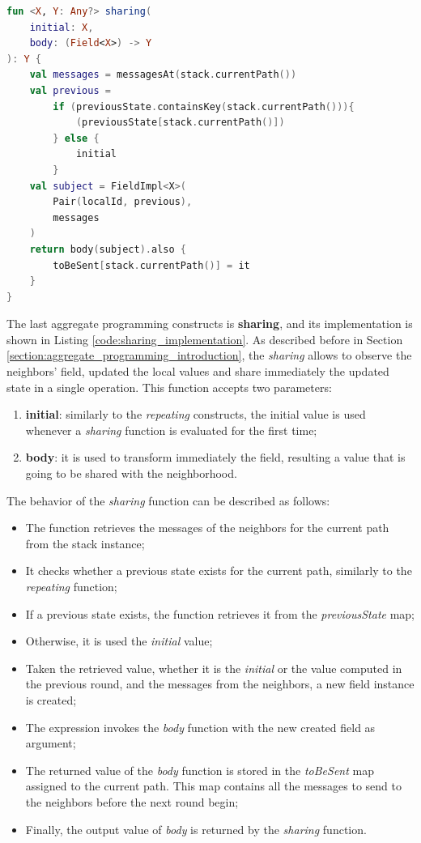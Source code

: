 \begin{lstlisting}[caption={Sharing implementation}, captionpos=b, language=Kotlin, label={code:sharing_implementation}]
fun <X, Y: Any?> sharing(
    initial: X,
    body: (Field<X>) -> Y
): Y {
    val messages = messagesAt(stack.currentPath())
    val previous = 
        if (previousState.containsKey(stack.currentPath())){
            (previousState[stack.currentPath()]) 
        } else {
            initial
        }
    val subject = FieldImpl<X>(
        Pair(localId, previous), 
        messages
    )
    return body(subject).also {
        toBeSent[stack.currentPath()] = it
    }
}
\end{lstlisting}
The last aggregate programming constructs is \textbf{sharing}, and its implementation is shown in Listing \ref{code:sharing_implementation}. As described before in Section \ref{section:aggregate_programming_introduction}, the \textit{sharing} allows to observe the
neighbors' field, updated the local values and share immediately the updated state in a
single operation.\newline
This function accepts two parameters:
\begin{enumerate}
    \item \textbf{initial}: similarly to the \textit{repeating} constructs, the initial value is used whenever a \textit{sharing} function is evaluated for the first time;
    \item \textbf{body}: it is used to transform immediately the field, resulting a value that is going to be shared with the neighborhood.
\end{enumerate}
The behavior of the \textit{sharing} function can be described as follows:
\begin{itemize}
    \item The function retrieves the messages of the neighbors for the current path from the stack instance;
    \item It checks whether a previous state exists for the current path, similarly to the \textit{repeating} function;
    \item If a previous state exists, the function retrieves it from the \textit{previousState} map;
    \item Otherwise, it is used the \textit{initial} value;
    \item Taken the retrieved value, whether it is the \textit{initial} or the value computed in the previous round, and the messages from the neighbors, a new field instance is created;
    \item The expression invokes the \textit{body} function with the new created field as argument;
    \item The returned value of the \textit{body} function is stored in the \textit{toBeSent} map assigned to the current path. This map contains all the messages to send to the neighbors before the next round begin;
    \item Finally, the output value of \textit{body} is returned by the \textit{sharing} function.
\end{itemize}

